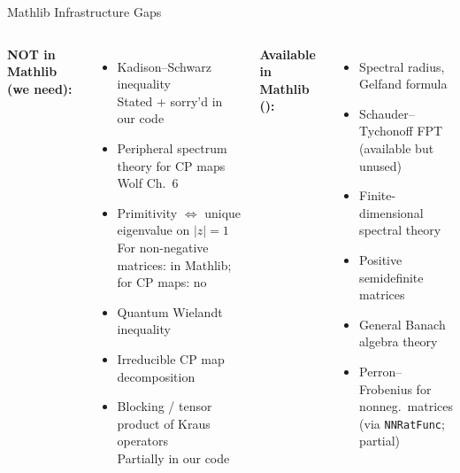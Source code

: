 \documentclass[aspectratio=169,10pt]{beamer}
\begin{document}
\begin{frame}{Mathlib Infrastructure Gaps}
    \vspace{-0.5em}

    \begin{columns}[T]
        \textbf{\textcolor{softred}{NOT in Mathlib} (we need):}
        \begin{itemize}\itemsep0.15em\small
            \item[\textcolor{softred}{$\boldsymbol\times$}] Kadison--Schwarz inequality\\
                  {\tiny Stated + sorry'd in our code}
            \item[\textcolor{softred}{$\boldsymbol\times$}] Peripheral spectrum theory for CP maps\\
                  {\tiny Wolf Ch.~6~\cite{Wolf2012Quantum}}
            \item[\textcolor{softred}{$\boldsymbol\times$}] Primitivity $\Leftrightarrow$ unique eigenvalue on $|z|{=}1$\\
                  {\tiny For non-negative matrices: in Mathlib; for CP maps: no}
            \item[\textcolor{softred}{$\boldsymbol\times$}] Quantum Wielandt inequality\\
                  {\tiny \cite{Sanz2010Quantum}}
            \item[\textcolor{softred}{$\boldsymbol\times$}] Irreducible CP map decomposition
            \item[\textcolor{softred}{$\boldsymbol\times$}] Blocking / tensor product of Kraus operators\\
                  {\tiny Partially in our code}
        \end{itemize}

        \textbf{\textcolor{leangreen}{Available in Mathlib} (\checkmark):}
        \begin{itemize}\itemsep0.15em\small
            \item[\textcolor{leangreen}{\checkmark}] Spectral radius, Gelfand formula
            \item[\textcolor{leangreen}{\checkmark}] Schauder--Tychonoff FPT\\
                  {\tiny (available but unused)}
            \item[\textcolor{leangreen}{\checkmark}] Finite-dimensional spectral theory
            \item[\textcolor{leangreen}{\checkmark}] Positive semidefinite matrices
            \item[\textcolor{leangreen}{\checkmark}] General Banach algebra theory
            \item[\textcolor{leangreen}{\checkmark}] Perron--Frobenius for nonneg.\ matrices\\
                  {\tiny (via \texttt{NNRatFunc}; partial)}
        \end{itemize}


\end{columns}
\end{frame}
\end{document}
